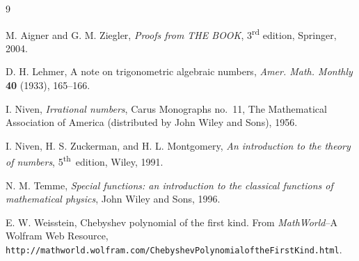 \documentclass[10pt,a4paper]{article}
\theoremstyle{remark}
\begin{document}
\begin{thebibliography}{9}

{M. Aigner and G. M. Ziegler},
\textit{Proofs from THE BOOK},
3\textsuperscript{rd} edition, Springer, 2004.

{D. H. Lehmer},
{A note on trigonometric algebraic numbers},
\textit{Amer. Math. Monthly}
\textbf{40} (1933), 165--166.

{I. Niven},
\textit{Irrational numbers},
Carus Monographs no.~11,
The Mathematical Association of America
(distributed by John Wiley and Sons), 1956.

{I. Niven, H. S. Zuckerman, and H. L. Montgomery},
\textit{An introduction to the theory of numbers},
5\textsuperscript{th}~edition, Wiley, 1991.

{N. M. Temme},
\textit{Special functions: an introduction to the classical functions of
mathematical physics},
John Wiley and Sons, 1996.

{E. W. Weisstein},
{Chebyshev polynomial of the first kind}.
From \textit{MathWorld}--A Wolfram Web Resource,
\texttt{http://mathworld.wolfram.com/\allowbreak ChebyshevPolynomialoftheFirstKind.html}.

\end{thebibliography}

\end{document}
